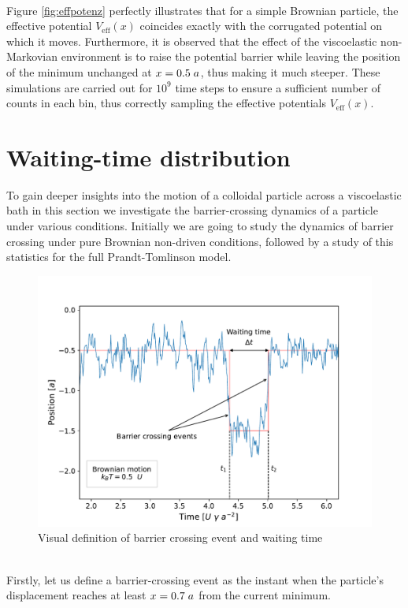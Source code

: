 \\
Figure \ref{fig:effpotenz} perfectly illustrates that for a simple Brownian particle, the effective potential $V_\text{eff}(x)$ coincides exactly with the corrugated potential on which it moves. Furthermore, it is observed that the effect of the viscoelastic non-Markovian environment is to raise the potential barrier while leaving the position of the minimum unchanged at $x=0.5\hspace{0.1cm}a$, thus making it much steeper. These simulations are carried out for $10^9$ time steps to ensure a sufficient number of counts in each bin, thus correctly sampling the effective potentials $V_\text{eff}(x)$.
\section{Waiting-time distribution}
To gain deeper insights into the motion of a colloidal particle across a viscoelastic bath in this section we investigate the barrier-crossing dynamics of a particle under various conditions. Initially we are going to study the dynamics of barrier crossing under pure Brownian non-driven conditions, followed by a study of this statistics for the full Prandt-Tomlinson model. 
\begin{figure}[ht!]
    \centering
    \includegraphics[width=\textwidth]{definition_barrcross2.pdf}
    \caption{Visual definition of barrier crossing event and waiting time}
    \label{fig:definition_barrcross}
\end{figure}
\\
Firstly, let us define a barrier-crossing event as the instant when the particle's displacement reaches at least $x = 0.7 \hspace{0.1cm}a$ from the current minimum.
